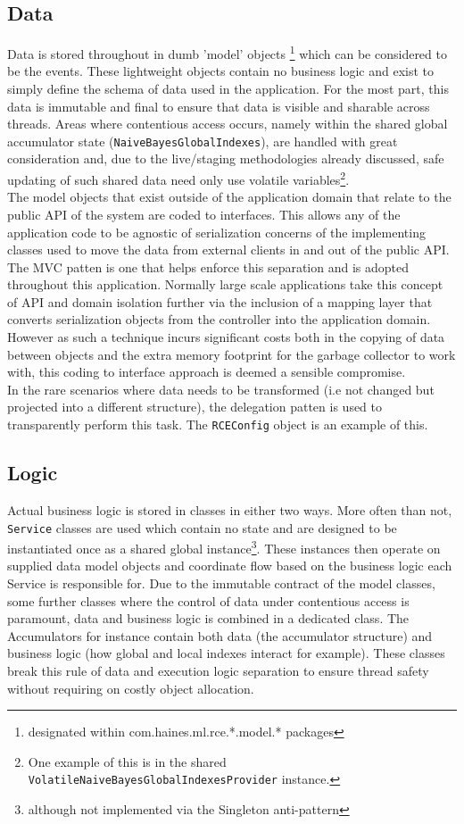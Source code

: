 \documentclass[a4paper,11pt]{scrreprt}
\begin{document}
\subsection{Data}
Data is stored throughout in dumb 'model' objects \footnote{designated within com.haines.ml.rce.*.model.* packages} which can be considered to be the events. These lightweight objects contain no business logic and exist to simply define the schema of data used in the application. For the most part, this data is immutable and final to ensure that data is visible and sharable across threads. Areas where contentious access occurs, namely within the shared global accumulator state (\verb|NaiveBayesGlobalIndexes|), are handled with great consideration and, due to the live/staging methodologies already discussed, safe updating of such shared data need only use volatile variables\footnote{One example of this is in the shared \verb|VolatileNaiveBayesGlobalIndexesProvider| instance.}.\\
The model objects that exist outside of the application domain that relate to the public API of the system are coded to interfaces. This allows any of the application code to be agnostic of serialization concerns of the implementing classes used to move the data from external clients in and out of the public API. The MVC patten is one that helps enforce this separation and is adopted throughout this application. Normally large scale applications take this concept of API and domain isolation further via the inclusion of a mapping layer that converts serialization objects from the controller into the application domain. However as such a technique incurs significant costs both in the copying of data between objects and the extra memory footprint for the garbage collector to work with, this coding to interface approach is deemed a sensible compromise. \\
In the rare scenarios where data needs to be transformed (i.e not changed but projected into a different structure), the delegation patten\cite{design-patterns} is used to transparently perform this task. The \verb|RCEConfig| object is an example of this.
\subsection{Logic}
Actual business logic is stored in classes in either two ways. More often than not, \verb|Service| classes are used which contain no state and are designed to be instantiated once as a shared global instance\footnote{although not implemented via the Singleton anti-pattern}. These instances then operate on supplied data model objects and coordinate flow based on the business logic each Service is responsible for. Due to the immutable contract of the model classes, some further classes where the control of data under contentious access is paramount, data and business logic is combined in a dedicated class. The Accumulators for instance contain both data (the accumulator structure) and business logic (how global and local indexes interact for example). These classes break this rule of data and execution logic separation to ensure thread safety without requiring on costly object allocation. 
\end{document}
